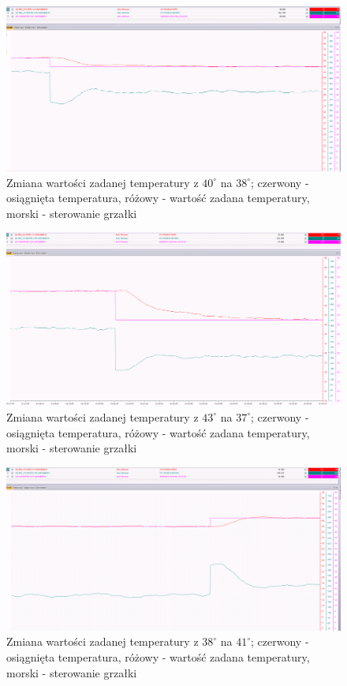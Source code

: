 \documentclass[12pt, a4paper]{article}
\begin{document}
\begin{figure}[H]
	\centering
	\includegraphics[width=0.9\linewidth]{SKOK_STEROWANIA}
	\caption{Zmiana wartości zadanej temperatury z  $40^\circ$ na $38^\circ$; czerwony - osiągnięta temperatura, różowy - wartość zadana temperatury, morski - sterowanie  grzałki}
	\label{fig:SKOK_STEROWANIA}
\end{figure}
\begin{figure}[H]
	\centering
	\includegraphics[width=0.9\linewidth]{sterowanie4337}
	\caption{Zmiana wartości zadanej temperatury z  $43^\circ$ na $37^\circ$; czerwony - osiągnięta temperatura, różowy - wartość zadana temperatury, morski - sterowanie  grzałki}
	\label{fig:sterowanie4337}
\end{figure}
\begin{figure}[H]
	\centering
	\includegraphics[width=0.9\linewidth]{wiatrak20temp3841}
	\caption{Zmiana wartości zadanej temperatury z  $38^\circ$ na $41^\circ$; czerwony - osiągnięta temperatura, różowy - wartość zadana temperatury, morski - sterowanie  grzałki}
	\label{fig:wiatrak20temp3841}
\end{figure}
\end{document}
